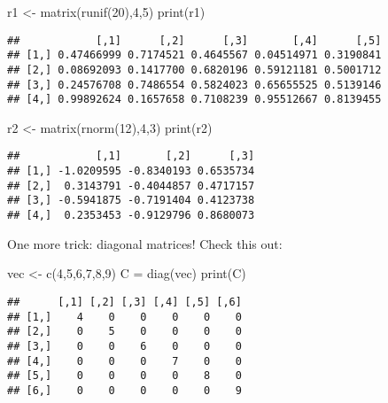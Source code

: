 \documentclass[
]{article}
\newenvironment{Shaded}{\begin{snugshade}}{\end{snugshade}}
\newcommand{\DecValTok}[1]{\textcolor[rgb]{0.00,0.00,0.81}{#1}}
\newcommand{\FunctionTok}[1]{\textcolor[rgb]{0.00,0.00,0.00}{#1}}
\newcommand{\NormalTok}[1]{#1}
\newcommand{\OtherTok}[1]{\textcolor[rgb]{0.56,0.35,0.01}{#1}}
\begin{document}
\begin{Shaded}
\begin{Highlighting}[]
\NormalTok{r1 }\OtherTok{\textless{}{-}} \FunctionTok{matrix}\NormalTok{(}\FunctionTok{runif}\NormalTok{(}\DecValTok{20}\NormalTok{),}\DecValTok{4}\NormalTok{,}\DecValTok{5}\NormalTok{)}
\FunctionTok{print}\NormalTok{(r1)}
\end{Highlighting}
\end{Shaded}

\begin{verbatim}
##            [,1]      [,2]      [,3]       [,4]      [,5]
## [1,] 0.47466999 0.7174521 0.4645567 0.04514971 0.3190841
## [2,] 0.08692093 0.1417700 0.6820196 0.59121181 0.5001712
## [3,] 0.24576708 0.7486554 0.5824023 0.65655525 0.5139146
## [4,] 0.99892624 0.1657658 0.7108239 0.95512667 0.8139455
\end{verbatim}

\begin{Shaded}
\begin{Highlighting}[]
\NormalTok{r2 }\OtherTok{\textless{}{-}} \FunctionTok{matrix}\NormalTok{(}\FunctionTok{rnorm}\NormalTok{(}\DecValTok{12}\NormalTok{),}\DecValTok{4}\NormalTok{,}\DecValTok{3}\NormalTok{)}
\FunctionTok{print}\NormalTok{(r2)}
\end{Highlighting}
\end{Shaded}

\begin{verbatim}
##            [,1]       [,2]      [,3]
## [1,] -1.0209595 -0.8340193 0.6535734
## [2,]  0.3143791 -0.4044857 0.4717157
## [3,] -0.5941875 -0.7191404 0.4123738
## [4,]  0.2353453 -0.9129796 0.8680073
\end{verbatim}

One more trick: diagonal matrices! Check this out:

\begin{Shaded}
\begin{Highlighting}[]
\NormalTok{vec }\OtherTok{\textless{}{-}} \FunctionTok{c}\NormalTok{(}\DecValTok{4}\NormalTok{,}\DecValTok{5}\NormalTok{,}\DecValTok{6}\NormalTok{,}\DecValTok{7}\NormalTok{,}\DecValTok{8}\NormalTok{,}\DecValTok{9}\NormalTok{)}
\NormalTok{C }\OtherTok{=} \FunctionTok{diag}\NormalTok{(vec)}
\FunctionTok{print}\NormalTok{(C)}
\end{Highlighting}
\end{Shaded}

\begin{verbatim}
##      [,1] [,2] [,3] [,4] [,5] [,6]
## [1,]    4    0    0    0    0    0
## [2,]    0    5    0    0    0    0
## [3,]    0    0    6    0    0    0
## [4,]    0    0    0    7    0    0
## [5,]    0    0    0    0    8    0
## [6,]    0    0    0    0    0    9
\end{verbatim}
\end{document}
